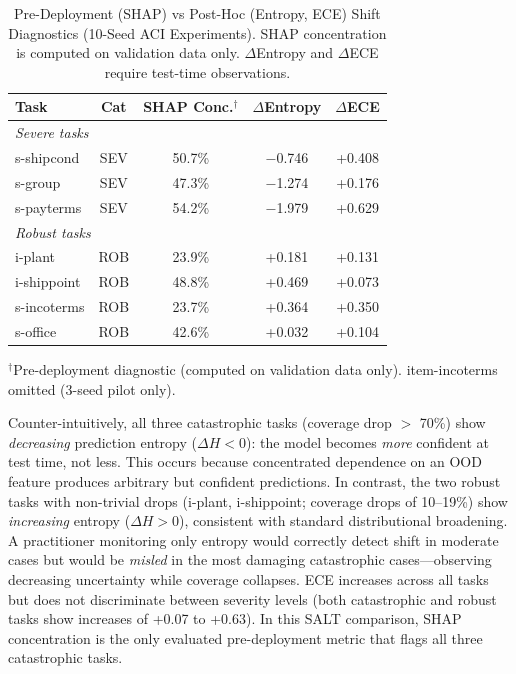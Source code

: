 \documentclass{uai2026} %
\begin{document}
\begin{table}[htbp]
\centering
\caption{Pre-Deployment (SHAP) vs Post-Hoc (Entropy, ECE) Shift Diagnostics (10-Seed ACI Experiments). SHAP concentration is computed on validation data only. $\Delta$Entropy and $\Delta$ECE require test-time observations.}\label{tab:baselines}
\small
\begin{tabular}{@{}lcccc@{}}
\toprule
Task & Cat & SHAP Conc.$^\dagger$ & $\Delta$Entropy & $\Delta$ECE \\
\midrule
\multicolumn{5}{l}{\textit{Severe tasks}} \\
s-shipcond & SEV & 50.7\% & $-$0.746 & +0.408 \\
s-group & SEV & 47.3\% & $-$1.274 & +0.176 \\
s-payterms & SEV & 54.2\% & $-$1.979 & +0.629 \\
\midrule
\multicolumn{5}{l}{\textit{Robust tasks}} \\
i-plant & ROB & 23.9\% & +0.181 & +0.131 \\
i-shippoint & ROB & 48.8\% & +0.469 & +0.073 \\
s-incoterms & ROB & 23.7\% & +0.364 & +0.350 \\
s-office & ROB & 42.6\% & +0.032 & +0.104 \\
\bottomrule
\end{tabular}


\raggedright
\footnotesize
$^\dagger$Pre-deployment diagnostic (computed on validation data only). item-incoterms omitted (3-seed pilot only).
\end{table}

Counter-intuitively, all three catastrophic tasks (coverage drop $>$ 70\%) show \textit{decreasing} prediction entropy ($\Delta H < 0$): the model becomes \textit{more} confident at test time, not less. This occurs because concentrated dependence on an OOD feature produces arbitrary but confident predictions. In contrast, the two robust tasks with non-trivial drops (i-plant, i-shippoint; coverage drops of 10--19\%) show \textit{increasing} entropy ($\Delta H > 0$), consistent with standard distributional broadening. A practitioner monitoring only entropy would correctly detect shift in moderate cases but would be \textit{misled} in the most damaging catastrophic cases---observing decreasing uncertainty while coverage collapses. ECE increases across all tasks but does not discriminate between severity levels (both catastrophic and robust tasks show increases of +0.07 to +0.63). In this SALT comparison, SHAP concentration is the only evaluated pre-deployment metric that flags all three catastrophic tasks.
\end{document}
